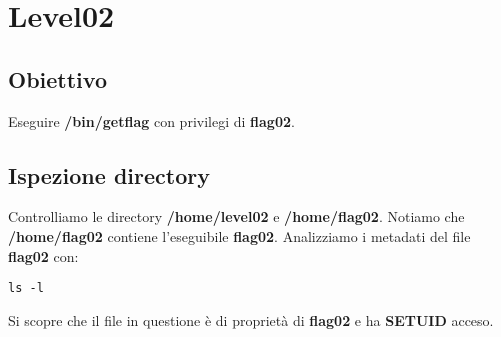 \section{Level02}
\subsection{Obiettivo}
Eseguire \textbf{/bin/getflag} con privilegi di \textbf{flag02}.
\subsection{Ispezione directory}
Controlliamo le directory \textbf{/home/level02} e \textbf{/home/flag02}. Notiamo che \textbf{/home/flag02} contiene l’eseguibile \textbf{flag02}.
Analizziamo i metadati del file \textbf{flag02} con: 
\begin{lstlisting}[style=bashstyle]
    ls -l
\end{lstlisting}
Si scopre che il file in questione è di proprietà di \textbf{flag02} e ha \textbf{SETUID} acceso.

